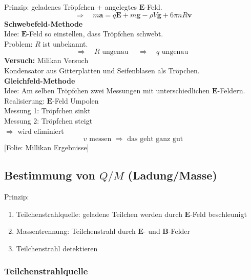\documentclass[titlepage,11pt,a4paper,ngerman]{report}
\newcommand{\tx}[1]{\textrm{#1}}
\newcommand{\folie}[1]{\color{gray}[Folie: #1]\color{black}}
\newcommand{\versuch}[1]{\color{red!50!black} \textbf{Versuch:} \color{black} #1\\ }
\renewcommand{\vec}[1]{\boldsymbol{#1}}
\begin{document}
Prinzip: geladenes Tröpfchen + angelegtes $ \vec{E} $-Feld.
\begin{equation*}
\Rightarrow \quad m \vec{a} = q \vec{E} + m \vec{g} - \rho V \vec{g} + 6 \pi n R \vec{v}
\end{equation*}
\textbf{Schwebefeld-Methode}\\
Idee: $ \vec{E} $-Feld so einstellen, dass Tröpfchen schwebt.\\
Problem: $ R $ ist unbekannt.
\begin{equation*}
\Rightarrow \quad R \tx{ ungenau } \quad \Rightarrow \quad q \tx{ ungenau }
\end{equation*}
\versuch{Milikan Versuch}
Kondensator aus Gitterplatten und Seifenblasen als Tröpchen.\\[5pt]
\textbf{Gleichfeld-Methode}\\
Idee: Am selben Tröpfchen zwei Messungen mit unterschiedlichen $ \vec{E} $-Feldern.\\
Realisierung: $ \vec{E} $-Feld Umpolen\\[5pt]
Messung 1: Tröpfchen sinkt\\
Messung 2: Tröpfchen steigt\\
$ \Rightarrow $ wird eliminiert
\begin{equation*}
v \tx{ messen } \Rightarrow \tx{ das geht ganz gut}
\end{equation*}
\folie{Millikan Ergebnisse}

\subsection{Bestimmung von \texorpdfstring{$ Q / M $}{Q/M} (Ladung/Masse)}

Prinzip:
\begin{enumerate}[1)]
	\item Teilchenstrahlquelle: geladene Teilchen werden durch $ \vec{E} $-Feld beschleunigt
	\item Massentrennung: Teilchenstrahl durch $ \vec{E} $- und $ \vec{B} $-Felder
	\item Teilchenstrahl detektieren
\end{enumerate}

\subsubsection{Teilchenstrahlquelle}
\end{document}
